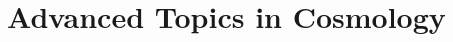 \documentclass[11pt]{elegantbook}
\begin{document}
\setcounter{part}{4}
\part{Advanced Topics in Cosmology}









\appendix


\end{document}
